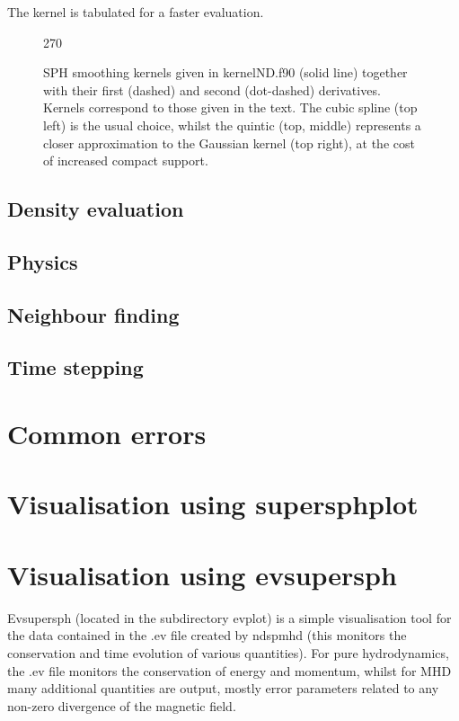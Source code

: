 \documentclass[a4paper,12pt]{article}
\begin{document}
 The kernel is tabulated for a faster evaluation. 

\begin{figure}[h]
\begin{center}
\begin{turn}{270}\end{turn}
\caption{SPH smoothing kernels given in kernelND.f90 (solid
line) together with their first (dashed) and second (dot-dashed) derivatives. Kernels
correspond to those given in the text. The cubic spline (top left) is the usual
choice, whilst the quintic (top, middle) represents a closer approximation to the Gaussian
kernel (top right), at the cost of increased compact support.}
\label{fig:kernels}
\end{center}
\end{figure}

\subsection{Density evaluation}

\subsection{Physics}

\subsection{Neighbour finding}

\subsection{Time stepping}

\section{Common errors}

\section{Visualisation using supersphplot}

\section{Visualisation using evsupersph}
 Evsupersph (located in the subdirectory evplot) is a simple visualisation tool for the data contained in the
.ev file created by ndspmhd (this monitors the conservation and time evolution
of various quantities). For pure hydrodynamics, the .ev file monitors the
conservation of energy and momentum, whilst for MHD many additional quantities
are output, mostly error parameters related to any non-zero divergence of the
magnetic field.
\end{document}
